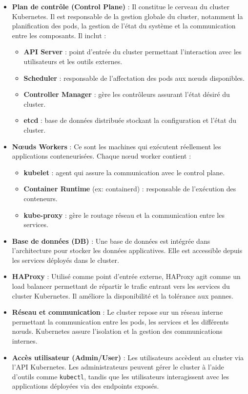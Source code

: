 \begin{itemize}
    \item \textbf{Plan de contrôle (Control Plane)} : Il constitue le cerveau du cluster Kubernetes. Il est responsable de la gestion globale du cluster, notamment la planification des pods, la gestion de l’état du système et la communication entre les composants. Il inclut :
    \begin{itemize}
        \item \textbf{API Server} : point d’entrée du cluster permettant l’interaction avec les utilisateurs et les outils externes.
        \item \textbf{Scheduler} : responsable de l’affectation des pods aux nœuds disponibles.
        \item \textbf{Controller Manager} : gère les contrôleurs assurant l’état désiré du cluster.
        \item \textbf{etcd} : base de données distribuée stockant la configuration et l’état du cluster.
    \end{itemize}

    \item \textbf{Nœuds Workers} : Ce sont les machines qui exécutent réellement les applications conteneurisées. Chaque nœud worker contient :
    \begin{itemize}
        \item \textbf{kubelet} : agent qui assure la communication avec le control plane.
        \item \textbf{Container Runtime} (ex: containerd) : responsable de l’exécution des conteneurs.
        \item \textbf{kube-proxy} : gère le routage réseau et la communication entre les services.
    \end{itemize}

    \item \textbf{Base de données (DB)} : Une base de données est intégrée dans l’architecture pour stocker les données applicatives. Elle est accessible depuis les services déployés dans le cluster.

    \item \textbf{HAProxy} : Utilisé comme point d’entrée externe, HAProxy agit comme un load balancer permettant de répartir le trafic entrant vers les services du cluster Kubernetes. Il améliore la disponibilité et la tolérance aux pannes.

    \item \textbf{Réseau et communication} : Le cluster repose sur un réseau interne permettant la communication entre les pods, les services et les différents nœuds. Kubernetes assure l’isolation et la gestion des communications internes.

    \item \textbf{Accès utilisateur (Admin/User)} : Les utilisateurs accèdent au cluster via l’API Kubernetes. Les administrateurs peuvent gérer le cluster à l’aide d’outils comme \texttt{kubectl}, tandis que les utilisateurs interagissent avec les applications déployées via des endpoints exposés.

\end{itemize}

